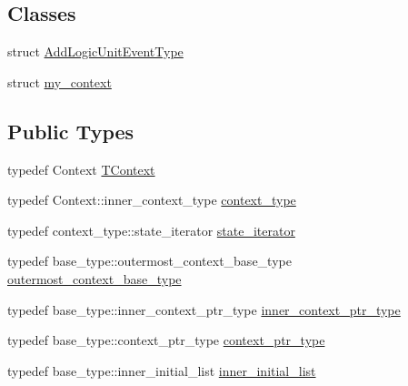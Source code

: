 \subsection*{Classes}
\begin{DoxyCompactItemize}
\item 
struct \hyperlink{structsmacc_1_1SmaccState_1_1AddLogicUnitEventType}{Add\+Logic\+Unit\+Event\+Type}
\item 
struct \hyperlink{structsmacc_1_1SmaccState_1_1my__context}{my\+\_\+context}
\end{DoxyCompactItemize}
\subsection*{Public Types}
\begin{DoxyCompactItemize}
\item 
typedef Context \hyperlink{classsmacc_1_1SmaccState_a9953ba0428a8c46f7d72c70bc3f87db4}{T\+Context}
\item 
typedef Context\+::inner\+\_\+context\+\_\+type \hyperlink{classsmacc_1_1SmaccState_a65c128d05dbcadbf817f41ba20b8fa01}{context\+\_\+type}
\item 
typedef context\+\_\+type\+::state\+\_\+iterator \hyperlink{classsmacc_1_1SmaccState_a12497b38e710f07cacb5d45efc024339}{state\+\_\+iterator}
\item 
typedef base\+\_\+type\+::outermost\+\_\+context\+\_\+base\+\_\+type \hyperlink{classsmacc_1_1SmaccState_aaf76bbe2aa9dd73e3284605f84ab4b16}{outermost\+\_\+context\+\_\+base\+\_\+type}
\item 
typedef base\+\_\+type\+::inner\+\_\+context\+\_\+ptr\+\_\+type \hyperlink{classsmacc_1_1SmaccState_a65a772c2e2039e9a59148ba6ffb54d8a}{inner\+\_\+context\+\_\+ptr\+\_\+type}
\item 
typedef base\+\_\+type\+::context\+\_\+ptr\+\_\+type \hyperlink{classsmacc_1_1SmaccState_a0e15b77514301039f6bc093a9d3f6425}{context\+\_\+ptr\+\_\+type}
\item 
typedef base\+\_\+type\+::inner\+\_\+initial\+\_\+list \hyperlink{classsmacc_1_1SmaccState_acb4ac84bce421d39b594510a6b2df558}{inner\+\_\+initial\+\_\+list}
\end{DoxyCompactItemize}
